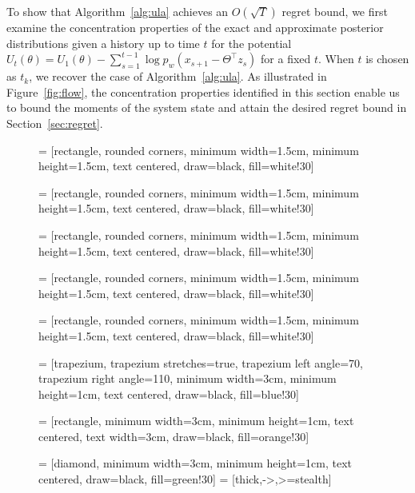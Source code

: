 \documentclass[11pt]{article}
\theoremstyle{plain}
\theoremstyle{definition}
\theoremstyle{remark}
\begin{document}
To show that Algorithm~\ref{alg:ula} achieves an $O(\sqrt{T})$ regret bound, 
we first examine the concentration properties of the exact and approximate posterior distributions given a history up to time $t$ for the potential $U_t(\theta)=U_1(\theta) - \sum_{s=1}^{t-1} \log p_w(x_{s+1}-\Theta^\top z_s)$ for a fixed $t$. When $t$ is chosen as $t_k$, we recover the case of Algorithm~\ref{alg:ula}.
As illustrated in Figure~\ref{fig:flow}, 
the concentration properties identified in this section enable us to bound the moments of the system state and attain the desired regret bound in Section~\ref{sec:regret}. 


\begin{figure}[h]
\centering
{} = [rectangle, rounded corners, 
minimum width=1.5cm, 
minimum height=1.5cm,
text centered, 
draw=black, 
fill=white!30]

 = [rectangle, rounded corners, 
minimum width=1.5cm, 
minimum height=1.5cm,
text centered, 
draw=black, 
fill=white!30]

 = [rectangle, rounded corners, 
minimum width=1.5cm, 
minimum height=1.5cm,
text centered, 
draw=black, 
fill=white!30]

 = [rectangle, rounded corners, 
minimum width=1.5cm, 
minimum height=1.5cm,
text centered, 
draw=black, 
fill=white!30]

 = [rectangle, rounded corners, 
minimum width=1.5cm, 
minimum height=1.5cm,
text centered, 
draw=black, 
fill=white!30]

 = [trapezium, 
trapezium stretches=true, %
trapezium left angle=70, 
trapezium right angle=110, 
minimum width=3cm, 
minimum height=1cm, text centered, 
draw=black, fill=blue!30]

 = [rectangle, 
minimum width=3cm, 
minimum height=1cm, 
text centered, 
text width=3cm, 
draw=black, 
fill=orange!30]

 = [diamond, 
minimum width=3cm, 
minimum height=1cm, 
text centered, 
draw=black, 
fill=green!30]
 = [thick,->,>=stealth]


\end{figure}
\end{document}
